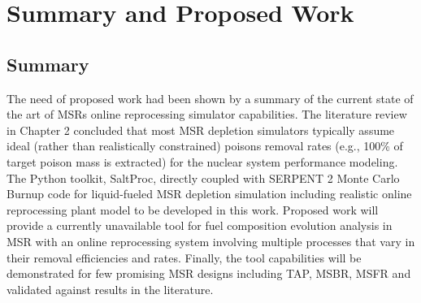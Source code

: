 \chapter[Summary and Proposed Work]{Summary and Proposed Work}

\section{Summary}
The need of proposed work had been shown by a summary of the 
current state of the art of \glspl{MSR} online reprocessing 
simulator capabilities. The literature review in Chapter 2 
concluded that most \gls{MSR} depletion simulators typically 
assume ideal (rather than realistically constrained) poisons 
removal rates (e.g., 100\% of target poison mass is extracted) 
for the nuclear system performance modeling. The Python 
toolkit, SaltProc, directly coupled with SERPENT 2 Monte Carlo Burnup 
code for liquid-fueled \gls{MSR} depletion simulation 
including realistic online reprocessing plant model to be developed 
in this work. Proposed work will provide a currently unavailable 
tool for fuel composition evolution analysis in \gls{MSR} with 
an online reprocessing system involving multiple processes 
that vary in their removal efficiencies and rates. Finally, 
the tool capabilities will be demonstrated for few promising 
\gls{MSR} designs including \gls{TAP}, 
\gls{MSBR}, \gls{MSFR} and validated against results in the 
literature.

 
